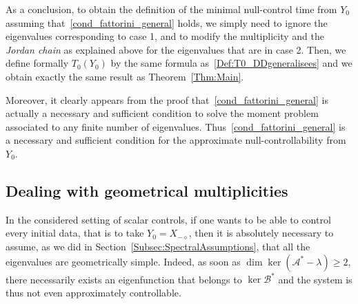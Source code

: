 \documentclass[10pt]{amsart}
\theoremstyle{definition}\newtheorem{defi}[theo]{Definition}\newtheorem{rema}[theo]{Remark}\newtheorem{exam}[theo]{Example}\newtheorem{exem}[theo]{Example}\newtheorem{nota}[theo]{Notation}
\newcommand\As{\mathcal{A}^*}
\newcommand\Bs{\mathcal{B}^*}
\newcommand{\Xmalpha}{X_{-\diamond}}
\newcommand{\Fzp}{Y_0}
\begin{document}
As a conclusion, to obtain the definition of the minimal null-control time from $\Fzp$ assuming that~\eqref{cond_fattorini_general} holds, we simply need to ignore the eigenvalues corresponding to case 1, and to modify the multiplicity and the {\em Jordan chain} as explained above for the eigenvalues that are in case 2. Then, we define formally $T_0(\Fzp)$ by the same formula as~\eqref{Def:T0_DDgeneralisees} and we obtain exactly the same result as Theorem~\ref{Thm:Main}.

Moreover, it clearly appears from the proof that~\eqref{cond_fattorini_general} is actually a necessary and sufficient condition to solve the moment problem associated to any finite number of eigenvalues. Thus~\eqref{cond_fattorini_general} is a necessary and sufficient condition for the approximate null-controllability from $\Fzp$.



\subsection{Dealing with geometrical multiplicities} \label{Subsec:MultipliciteGeo}

In the considered setting of scalar controls, if one wants to be able to control every initial data, that is to take $\Fzp=\Xmalpha$, then it is absolutely necessary to assume, as we did in Section~\ref{Subsec:SpectralAssumptions}, that all the eigenvalues are geometrically simple. Indeed, as soon as $\dim \ker(\As-\lambda)\geq 2$, there necessarily exists an eigenfunction that belongs to $\ker \Bs$ and the system is thus not even approximately controllable.
\end{document}
